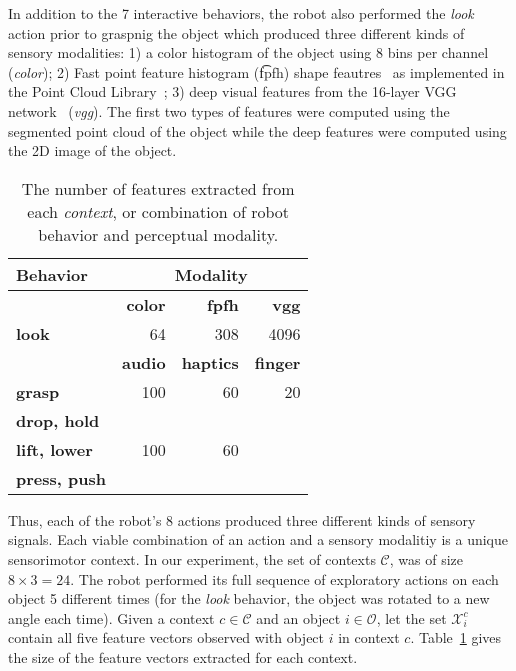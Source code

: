 In addition to the 7 interactive behaviors, the robot also performed the {\it look} action prior to graspnig the object which produced three different kinds of sensory modalities: 1) a color histogram of the object using 8 bins per channel ({\it color}); 2) Fast point feature histogram ({\t fpfh}) shape feautres~\cite{rusu:icra09} as implemented in the Point Cloud Library~\cite{aldoma:ram12}; 3) deep visual features from the 16-layer VGG network~\cite{simonyan:corr14} ({\it vgg}).
The first two types of features were computed using the segmented point cloud of the object while the deep features were computed using the 2D image of the object. 

\begin{table}
\centering
\begin{tabular}[h]{|l|r|r|r|}
	\hline
	\bf Behavior & \multicolumn{3}{c|}{\bf Modality} \\ \hline \hline
	& \bf color & \bf fpfh & \bf vgg \\ \hline
	\bf look & 64 & 308 & 4096 \\ \hline \hline
	& \bf audio & \bf haptics & \bf finger \\ \hline
	\bf grasp & 100 & 60 & 20 \\ \hline
	\bf drop, hold & & & \\
	\bf lift, lower & 100 & 60 & \\
	\bf press, push & & & \\ \hline
\end{tabular}
\caption{The number of features extracted from each \textit{context}, or combination of robot behavior and perceptual modality.}
\label{tab:feature_space_of_contexts}
\end{table}

Thus, each of the robot's 8 actions produced three different kinds of sensory signals.
Each viable combination of an action and a sensory modalitiy is a unique sensorimotor context.
In our experiment, the set of contexts $\mathcal{C}$, was of size  $8 \times 3 = 24$.
The robot performed its full sequence of exploratory actions on each object 5 different times (for the {\it look} behavior, the object was rotated to a new angle each time). Given a context $c \in \mathcal{C}$ and an object $i \in \mathcal{O}$, let the set $\mathcal{X}_i^c$ contain all five feature vectors observed with object $i$ in context $c$.
Table~\ref{tab:feature_space_of_contexts} gives the size of the feature vectors extracted for each context.